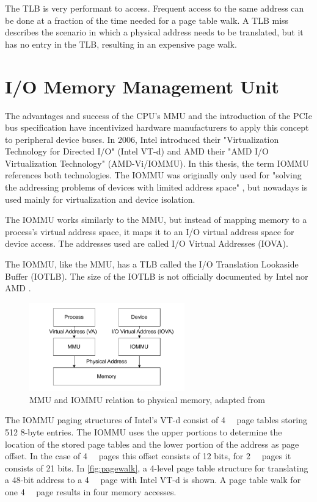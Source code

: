 The TLB is very performant to access. Frequent access to the same address can be done at a fraction of the time needed for a page table walk. A TLB miss describes the scenario in which a physical address needs to be translated, but it has no entry in the TLB, resulting in an expensive page walk.

\section{I/O Memory Management Unit}
The advantages and success of the CPU's MMU and the introduction of the PCIe bus specification have incentivized hardware manufacturers to apply this concept to peripheral device buses. In 2006, Intel introduced their "Virtualization Technology for Directed I/O" (Intel VT-d) and AMD their "AMD I/O Virtualization Technology" (AMD-Vi/IOMMU). In this thesis, the term IOMMU references both technologies. The IOMMU was originally only used for "solving the addressing problems of devices with limited address space" \cite{vfiokerneldocs}, but nowadays is used mainly for virtualization and device isolation.

The IOMMU works similarly to the MMU, but instead of mapping memory to a process's virtual address space, it maps it to an I/O virtual address space for device access. The addresses used are called I/O Virtual Addresses (IOVA).

The IOMMU, like the MMU, has a TLB called the I/O Translation Lookaside Buffer (IOTLB). The size of the IOTLB is not officially documented by Intel nor AMD \cite{iommuhuber}.

\begin{figure}[H]
    \centering
    \includegraphics[width=0.6\textwidth]{figures/MMUIOMMU.pdf}
    \caption{MMU and IOMMU relation to physical memory, adapted from \cite{iommuscalability}}
    \label{fig:mmuvsiommu}
\end{figure}

The IOMMU paging structures of Intel's VT-d consist of \qty{4}{\kibi\byte} page tables storing 512 8-byte entries. The IOMMU uses the upper portions to determine the location of the stored page tables and the lower portion of the address as page offset. In the case of \qty{4}{\kibi\byte} pages this offset consists of 12 bits, for \qty{2}{\mebi\byte} pages it consists of 21 bits.
In \autoref{fig:pagewalk}, a 4-level page table structure for translating a 48-bit address to a \qty{4}{\kibi\byte} page with Intel VT-d is shown. A page table walk for one \qty{4}{\kibi\byte} page results in four memory accesses.

